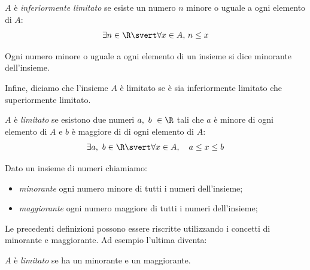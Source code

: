 \begin{newdef}{}{}
\(A\) è \emph{inferiormente limitato} se esiste un numero \(n\) 
minore o uguale a ogni elemento di \(A\):
\[\exists n \in \R \svert \forall x \in A,\, n \leq x\]
\end{newdef}

Ogni numero minore o uguale a ogni elemento di un insieme si dice minorante 
dell'insieme.


\vspace{.5em}
Infine, diciamo che l'insieme \(A\) è limitato se è sia inferiormente limitato 
che superiormente limitato.

\begin{newdef}{}{}
\(A\) è \emph{limitato} se esistono due numeri \(a,~b~ \in \R\) tali che \(a\) 
è minore di ogni elemento di \(A\) e \(b\) è maggiore di di ogni elemento di 
\(A\):
\[\exists a,~b \in \R \svert \forall x \in A,\quad a \leq x \leq b\]
\end{newdef}

\begin{newdef}{}{}
Dato un insieme di numeri chiamiamo:
\begin{itemize} [nosep]
\item \emph{minorante} ogni numero minore di tutti i numeri dell'insieme;
\item \emph{maggiorante} ogni numero maggiore di tutti i numeri dell'insieme;
\end{itemize}
\end{newdef}

Le precedenti definizioni possono essere riscritte utilizzando i concetti di 
minorante e maggiorante. 
Ad esempio l'ultima diventa:

\begin{newdef}{}{}
\(A\) è \emph{limitato} se ha un minorante e un maggiorante.
\end{newdef}

